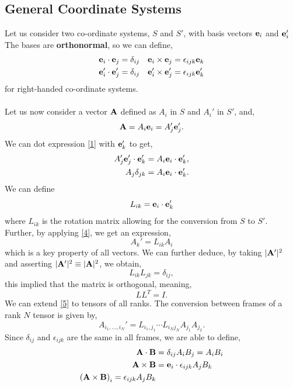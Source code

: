 \documentclass{book}
\begin{document}
\subsection{General Coordinate Systems}
Let us consider two co-ordinate systems, $S$ and $S'$, with basis vectors $\vb{e}_i$ and $\vb{e}_i'$ The bases are \textbf{orthonormal}, so we can define,
\begin{align}\label{genunit}
    \vb{e}_i \cdot \vb{e}_j &= \delta_{ij}  & \vb{e}_i \times \vb{e}_j &= \epsilon_{ijk}\vb{e}_k \\
    \vb{e}_i' \cdot \vb{e}_j' &= \delta_{ij}  & \vb{e}_i' \times \vb{e}_j' &= \epsilon_{ijk}\vb{e}_k' 
\end{align}
for right-handed co-ordinate systems. \\\\
Let us now consider a vector $\vb{A}$ defined as $A_i$ in $S$ and $A_i'$ in $S'$, and,
\begin{equation} \label{1}
    \vb{A} = A_i\vb{e}_i = A_j'\vb{e}_j'.
\end{equation}
We can dot expression \eqref{1} with $\vb{e}_k'$ to get,
\begin{equation}
    \begin{split}\label{2}
        A_j'\vb{e}_j'\cdot\vb{e}_k' & = A_i \vb{e}_i \cdot \vb{e}_k', \\
        A_j\delta_{jk} & = A_i \vb{e}_i \cdot \vb{e}_k'.
    \end{split}
\end{equation}
We can define 
\begin{equation}
    L_{ik} = \vb{e}_i \cdot \vb{e}_k'
\end{equation}
where $L_{ik}$ is the rotation matrix allowing for the conversion from $S$ to $S'$. Further, by applying \eqref{4}, we get an expression,
\begin{equation}\label{5}
    A_k' = L_{ik}A_i
\end{equation}
which is a key property of all vectors. We can further deduce, by taking $|\vb{A}'|^2$ and asserting $|\vb{A}'|^2 \equiv |\vb{A}|^2$, we obtain,
\begin{equation}
    L_{ik}L_{jk} = \delta_{ij},
\end{equation}
this implied that the matrix is orthogonal, meaning,
\begin{equation}
    LL^T = I.
\end{equation}
We can extend \eqref{5} to tensors of all ranks. The conversion between frames of a rank $N$ tensor is given by,
\begin{equation}
    A_{i_1,\ldots,i_N}' = L_{i_1,j_1}\cdots L_{i_Nj_N} A_{j_1} A_{j_2}.
\end{equation}
Since $\delta_{ij}$ and $\epsilon_{ijk}$ are the same in all frames, we are able to define, 
\begin{equation}
    \begin{split}
        \vb{A}\cdot\vb{B} & = \delta_{ij}A_iB_j = A_iB_i \\
        \vb{A}\times\vb{B} & = \vb{e}_i \cdot \epsilon_{ijk}A_jB_k \\
        \left(\vb{A}\times\vb{B}\right)_i = \epsilon_{ijk}A_jB_k
    \end{split}
\end{equation}
\end{document}
